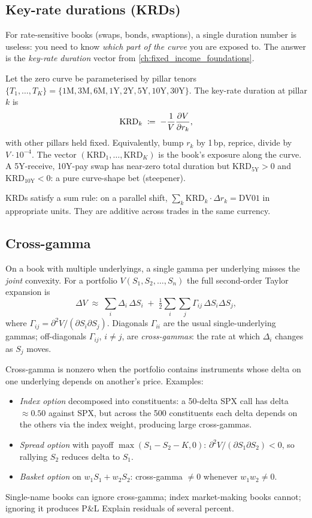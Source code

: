 \subsection{Key-rate durations (KRDs)}

For rate-sensitive books (swaps, bonds, swaptions), a single
duration number is useless: you need to know \emph{which part of
the curve} you are exposed to.  The answer is the \emph{key-rate
duration} vector from \cref{ch:fixed_income_foundations}.

Let the zero curve be parameterised by pillar tenors $\{T_1, \ldots,
T_K\} = \{1\mathrm{M}, 3\mathrm{M}, 6\mathrm{M}, 1\mathrm{Y},
2\mathrm{Y}, 5\mathrm{Y}, 10\mathrm{Y}, 30\mathrm{Y}\}$.  The
key-rate duration at pillar $k$ is
\[
  \mathrm{KRD}_k
  \;\coloneqq\; -\frac{1}{V} \frac{\partial V}{\partial r_k},
\]
with other pillars held fixed.  Equivalently, bump $r_k$ by 1\,bp,
reprice, divide by $V \cdot 10^{-4}$.  The vector
$(\mathrm{KRD}_1, \ldots, \mathrm{KRD}_K)$ is the book's exposure
along the curve.  A 5Y-receive, 10Y-pay swap has near-zero total
duration but $\mathrm{KRD}_{5\mathrm{Y}} > 0$ and
$\mathrm{KRD}_{10\mathrm{Y}} < 0$: a pure curve-shape bet
(steepener).

KRDs satisfy a sum rule: on a parallel shift, $\sum_k
\mathrm{KRD}_k \cdot \Delta r_k = \mathrm{DV01}$ in appropriate
units.  They are additive across trades in the same currency.

\subsection{Cross-gamma}

On a book with multiple underlyings, a single gamma per underlying
misses the \emph{joint} convexity.  For a portfolio $V(S_1, S_2,
\ldots, S_n)$ the full second-order Taylor expansion is
\[
  \Delta V
  \;\approx\;
  \sum_i \Delta_i \, \Delta S_i
  \;+\; \tfrac{1}{2} \sum_i \sum_j \Gamma_{ij} \, \Delta S_i \Delta S_j,
\]
where $\Gamma_{ij} = \partial^2 V / (\partial S_i \partial S_j)$.
Diagonals $\Gamma_{ii}$ are the usual single-underlying gammas;
off-diagonals $\Gamma_{ij}$, $i \ne j$, are \emph{cross-gammas}:
the rate at which $\Delta_i$ changes as $S_j$ moves.

Cross-gamma is nonzero when the portfolio contains instruments
whose delta on one underlying depends on another's price.  Examples:
\begin{itemize}
  \item \emph{Index option} decomposed into constituents: a
    50-delta SPX call has delta $\approx 0.50$ against SPX, but
    across the 500 constituents each delta depends on the others
    via the index weight, producing large cross-gammas.
  \item \emph{Spread option} with payoff $\max(S_1 - S_2 - K, 0)$:
    $\partial^2 V / (\partial S_1 \partial S_2) < 0$, so rallying
    $S_2$ reduces delta to $S_1$.
  \item \emph{Basket option} on $w_1 S_1 + w_2 S_2$: cross-gamma
    $\ne 0$ whenever $w_1 w_2 \ne 0$.
\end{itemize}
Single-name books can ignore cross-gamma; index market-making books
cannot; ignoring it produces P\&L Explain residuals of several
percent.

